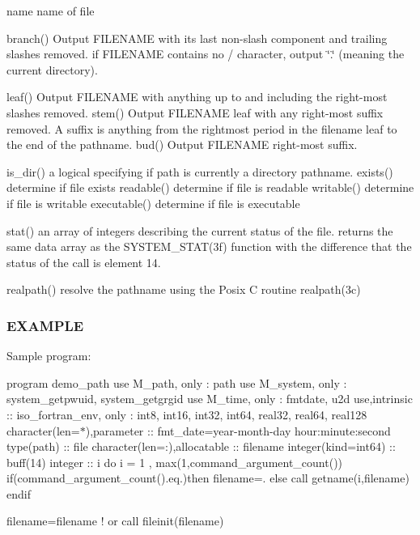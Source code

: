 name name of file

branch() Output F\+I\+L\+E\+N\+A\+ME with its last non-\/slash component and trailing slashes removed. if F\+I\+L\+E\+N\+A\+ME contains no \textquotesingle{}/\textquotesingle{} character, output \char`\"{}.\char`\"{} (meaning the current directory).

leaf() Output F\+I\+L\+E\+N\+A\+ME with anything up to and including the right-\/most slashes removed. stem() Output F\+I\+L\+E\+N\+A\+ME leaf with any right-\/most suffix removed. A suffix is anything from the rightmost period in the filename leaf to the end of the pathname. bud() Output F\+I\+L\+E\+N\+A\+ME right-\/most suffix.

is\+\_\+dir() a logical specifying if path is currently a directory pathname. exists() determine if file exists readable() determine if file is readable writable() determine if file is writable executable() determine if file is executable

stat() an array of integers describing the current status of the file. returns the same data array as the S\+Y\+S\+T\+E\+M\+\_\+\+S\+T\+A\+T(3f) function with the difference that the status of the call is element 14.

realpath() resolve the pathname using the Posix C routine realpath(3c)

\subsubsection*{E\+X\+A\+M\+P\+LE}

Sample program\+:

program demo\+\_\+path use M\+\_\+path, only \+: path use M\+\_\+system, only \+: system\+\_\+getpwuid, system\+\_\+getgrgid use M\+\_\+time, only \+: fmtdate, u2d use,intrinsic \+:\+: iso\+\_\+fortran\+\_\+env, only \+: int8, int16, int32, int64, real32, real64, real128 character(len=$\ast$),parameter \+:\+: fmt\+\_\+date=\textquotesingle{}year-\/month-\/day hour\+:minute\+:second\textquotesingle{} type(path) \+:\+: file character(len=\+:),allocatable \+:\+: filename integer(kind=int64) \+:\+: buff(14) integer \+:\+: i do i = 1 , max(1,command\+\_\+argument\+\_\+count()) if(command\+\_\+argument\+\_\+count().eq.)then filename=\textquotesingle{}.\textquotesingle{} else call getname(i,filename) endif

filename=filename ! or call fileinit(filename)

